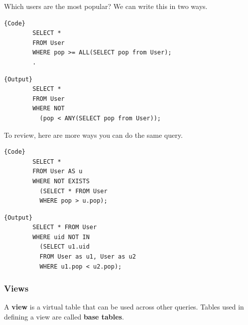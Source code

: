    \begin{example}
      \label{ex:popular-users}
      Which users are the most popular? We can write this in two ways. 

      \noindent\begin{minipage}{.5\textwidth}
      \begin{lstlisting}[]{Code}
        SELECT * 
        FROM User 
        WHERE pop >= ALL(SELECT pop from User); 
        .
      \end{lstlisting}
      \end{minipage}
      \hfill
      \begin{minipage}{.49\textwidth}
      \begin{lstlisting}[]{Output}
        SELECT * 
        FROM User 
        WHERE NOT 
          (pop < ANY(SELECT pop from User)); 
      \end{lstlisting}
      \end{minipage}

      To review, here are more ways you can do the same query. 

      \noindent\begin{minipage}{.5\textwidth}
      \begin{lstlisting}[]{Code}
        SELECT * 
        FROM User AS u 
        WHERE NOT EXISTS  
          (SELECT * FROM User
          WHERE pop > u.pop); 
      \end{lstlisting}
      \end{minipage}
      \hfill
      \begin{minipage}{.49\textwidth}
      \begin{lstlisting}[]{Output}
        SELECT * FROM User 
        WHERE uid NOT IN 
          (SELECT u1.uid
          FROM User as u1, User as u2 
          WHERE u1.pop < u2.pop); 
      \end{lstlisting}
      \end{minipage}
    \end{example}
  
  \subsubsection{Views}

    \begin{definition}[View]
      \label{def:view}
      A \textbf{view} is a virtual table that can be used across other queries. Tables used in defining a view are called \textbf{base tables}. 
    \end{definition}

